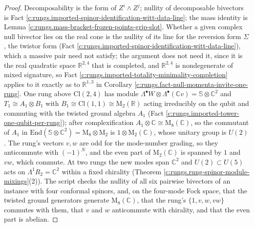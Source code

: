 \documentclass[11pt]{article}
\theoremstyle{definition}
\theoremstyle{plain}
\providecommand{\C}{}\renewcommand{\C}{\mathbb{C}}
\providecommand{\Cl}{}\renewcommand{\Cl}{\mathrm{Cl}}
\providecommand{\R}{}\renewcommand{\R}{\mathbb{R}}
\providecommand{\Sp}{}\renewcommand{\Sp}{\mathbb{S}}
\begin{document}
\begin{proof}
Decomposability is the form of $Z^{i} \wedge Z^{j}$; nullity of decomposable bivectors is Fact \ref{c:rungs.imported-spinor-identification-witt-data-line}; the mass identity is Lemma \ref{c:rungs.mass-bracket-frozen-points-grip-slot}. Whether a given complex null bivector lies on the real cone is the nullity of its line for the reversion form $\Sigma$, the twistor form (Fact \ref{c:rungs.imported-spinor-identification-witt-data-line}), which a massive pair need not satisfy; the argument does not need it, since it is the real quadratic space $\R^{2,4}$ that is completed, and $\R^{2,4}$ is nondegenerate of mixed signature, so Fact \ref{c:rungs.imported-totality-minimality-completion} applies to it exactly as to $\R^{1,3}$ in Corollary \ref{c:rungs.fact-null-momenta-invite-one-rung}. One rung above $\Cl(2,4)$ has module $\Lambda^{\bullet}W \otimes \Lambda^{\bullet}(\C v) = \Sp \otimes \C^{2}$ and $T_{1} \cong A_{1} \otimes B_{1}$ with $B_{1} \cong \Cl(1,1) \cong \mathrm{M}_{2}(\R)$ acting irreducibly on the qubit and commuting with the twisted ground algebra $A_{1}$ (Fact \ref{c:rungs.imported-tower-one-qubit-per-rung}); after complexification $A_{1} \otimes \C \cong \mathrm{M}_{8}(\C)$, so the commutant of $A_{1}$ in $\mathrm{End}(\Sp \otimes \C^{2}) = \mathrm{M}_{8} \otimes \mathrm{M}_{2}$ is $1 \otimes \mathrm{M}_{2}(\C)$, whose unitary group is $U(2)$. The rung's vectors $v, w$ are odd for the mode-number grading, so they anticommute with $(-1)^{N}$, and the even part of $\mathrm{M}_{2}(\C)$ is spanned by $1$ and $vw$, which commute. At two rungs the new modes span $\C^{2}$ and $U(2) \subset U(5)$ acts on $\Lambda^{1}R_{2} = \C^{2}$ within a fixed chirality (Theorem \ref{c:rungs.rung-spinor-module-mixings}(2)). The script checks the nullity of all six pairwise bivectors of an instance with four conformal spinors, and, on the four-mode Fock space, that the twisted ground generators generate $\mathrm{M}_{8}(\C)$, that the rung's $\{1, v, w, vw\}$ commutes with them, that $v$ and $w$ anticommute with chirality, and that the even part is abelian.

\end{proof}
\end{document}
